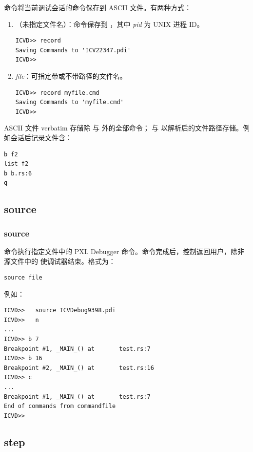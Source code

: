  命令将当前调试会话的命令保存到 ASCII 文件。有两种方式：

\begin{enumerate}
  \item {}（未指定文件名）：命令保存到 ，其中 \textit{pid} 为 UNIX 进程 ID。
\begin{lstlisting}
ICVD>> record
Saving Commands to 'ICV22347.pdi'
ICVD>>
\end{lstlisting}

  \item {} \textit{file}：可指定带或不带路径的文件名。
\begin{lstlisting}
ICVD>> record myfile.cmd
Saving Commands to 'myfile.cmd'
ICVD>>
\end{lstlisting}
\end{enumerate}

ASCII 文件 verbatim 存储除  与  外的全部命令； 与  以解析后的文件路径存储。例如会话后记录文件含：

\begin{lstlisting}
b f2
list f2
b b.rs:6
q
\end{lstlisting}

\subsection{source}
\subsubsection*{source}

 命令执行指定文件中的 PXL Debugger 命令。命令完成后，控制返回用户，除非源文件中的  使调试器结束。格式为：

\begin{lstlisting}
source file
\end{lstlisting}

例如：
\begin{lstlisting}
ICVD>>   source ICVDebug9398.pdi
ICVD>>   n
...
ICVD>> b 7
Breakpoint #1, _MAIN_() at       test.rs:7
ICVD>> b 16
Breakpoint #2, _MAIN_() at       test.rs:16
ICVD>> c
...
Breakpoint #1, _MAIN_() at       test.rs:7
End of commands from commandfile
ICVD>>
\end{lstlisting}

\subsection{step}
